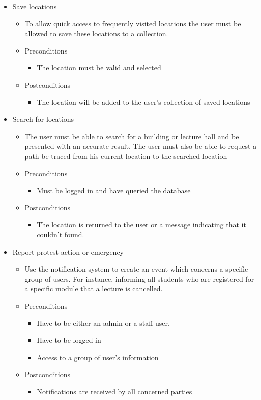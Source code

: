 \documentclass[12pt]{article}
\begin{document}
\begin{enumerate}
\begin{itemize}
				\item Save locations
				\begin{itemize}
					\item To allow quick access to frequently visited locations the user must be allowed to save these locations to a collection.
					\item Preconditions
					\begin{itemize}
						\item The location must be valid and selected
					\end{itemize}
					\item Postconditions
					\begin{itemize}
						\item The location will be added to the user’s collection of saved locations
					\end{itemize}
				\end{itemize}
				
				\item Search for locations
				\begin{itemize}
					\item The user must be able to search for a building or lecture hall and be presented with an accurate result. The user must also be able to request a path be traced from his current location to the searched location
					\item Preconditions
					\begin{itemize}
						\item Must be logged in and have queried the database
					\end{itemize}
					\item Postconditions
					\begin{itemize}
						\item The location is returned to the user or a message indicating that it couldn’t found.
					\end{itemize}
				\end{itemize}
				
				\item Report protest action or emergency
				\begin{itemize}
					\item Use the notification system to create an event which concerns a specific group of users. For instance, informing all students who are registered for a specific module that a lecture is cancelled.
					\item Preconditions
					\begin{itemize}
						\item Have to be either an admin or a staff user.
						\item Have to be logged in
						\item Access to a group of user’s information
					\end{itemize}
					\item Postconditions
					\begin{itemize}
						\item Notifications are received by all concerned parties
					\end{itemize}
				\end{itemize}
				

\end{itemize}
\end{enumerate}
\end{document}
